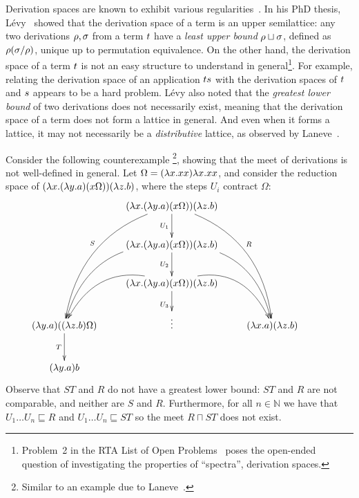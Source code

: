 Derivation spaces are known to exhibit various
regularities~\cite{Tesis:Levy:1978,DBLP:journals/tcs/Zilli84,laneve1994distributive,thesismellies,levy_redex_stability,DBLP:conf/lics/AspertiL13}.
In his PhD thesis, L\'evy~\cite{Tesis:Levy:1978} showed that the derivation space of a term is
an upper semilattice: any two derivations $\rho,\sigma$ from a term $t$
have a {\em least upper bound} $\rho \sqcup \sigma$, defined as $\rho(\sigma/\rho)$,
unique up to permutation equivalence.
On the other hand, the derivation space of a term $t$ is not an easy structure to understand in general\footnote{Problem~2 in
the RTA List of Open Problems~\cite{dershowitz1991open} poses
the open-ended question of investigating the properties of ``spectra'', \ie derivation spaces.}.
For example, relating the derivation space of an application $ts$
with the derivation spaces of $t$ and $s$ appears to be a hard problem.
L\'evy also noted that the {\em greatest lower bound} of two derivations does
not necessarily exist, meaning that the derivation space of a term does not form a lattice in general.
And even when it forms a lattice, it may not necessarily be a {\em distributive} lattice,
as observed by Laneve~\cite{laneve1994distributive}.

Consider the following counterexample
\footnote{Similar to an example due to Laneve~\cite{laneve1994distributive}.}, showing that the meet of derivations is not well-defined in general.
Let $\Omega = (\lambda x. xx)\lambda x. xx$,
and consider the reduction space of
  $(\lambda x. (\lambda y. a)(x \Omega)) (\lambda z. b)$,
where the steps $U_i$ contract $\Omega$:
\[
  \xymatrix{
    &
    (\lam{\var}{(\lam{\vartwo}{a})(\var \Omega)}) (\lam{\varthree}{b})
    \ar_{U_1}[d]
    \ar@/_1cm/_{S}[dddl]
    \ar@/^1cm/^{R}[dddr]
    &
  \\
    &
    (\lam{\var}{(\lam{\vartwo}{a})(\var \Omega)}) (\lam{\varthree}{b})
    \ar@/_1cm/[ddl] \ar@/^1cm/[ddr]
    \ar_{U_2}[d]
    &
  \\
    &
    (\lam{\var}{(\lam{\vartwo}{a})(\var \Omega)}) (\lam{\varthree}{b})
    \ar@/_1cm/[dl] \ar@/^1cm/[dr]
    \ar_{U_3}[d]
    &
  \\
    (\lam{\vartwo}{a})((\lam{\varthree}{b}) \Omega)
    \ar_{T}[d]
    &
    \vdots
    &
    (\lam{\var}{a})(\lam{\varthree}{b})
  \\
    (\lam{\vartwo}{a}) b
    &
    &
    &
  }
\]
Observe that $ST$ and $R$ do not have a greatest lower bound: $ST$ and $R$ are not
comparable, and neither are $S$ and $R$.
Furthermore, for all $n \in \mathbb{N}$ we have that $U_1 \hdots U_n \sqsubseteq R$
and $U_1 \hdots U_n \sqsubseteq ST$ so the meet $R \sqcap ST$ does not exist.



